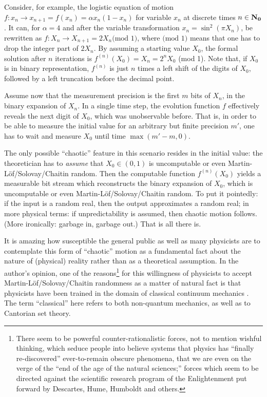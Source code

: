 Consider, for example, the
logistic equation of motion
$f:x_n\rightarrow x_{n+1}=f(x_n)=\alpha x_n(1-x_n)$ for variable $x_n$
at discrete times
$n\in {\Bbb N_0}$. It can, for $\alpha =4$
and after the variable transformation $x_n=\sin^2(\pi
X_n)$, be rewritten as $f:X_n\rightarrow X_{n+1}=2X_n \mbox{(mod
1)}$,
where $\mbox{(mod 1)}$ means that one has to drop the integer part of
$2X_n$. By assuming a starting value $X_0$, the formal solution after
$n$ iterations is $f^{(n)}(X_0)=X_n=2^nX_0$ (mod 1).
Note that,
if $X_0$ is in binary representation, $f^{(n)}$ is just $n$ times a left
 shift
of the digits of $X_0$, followed by a left truncation before the decimal
point.

Assume now that the measurement precision is the first $m$ bits of
$X_n$,
in the binary expansion of
$X_n$. In a single time step, the evolution function $f$ effectively
reveals the next digit of $X_0$, which was unobservable before.
That is, in order to be able to measure the initial value for an
arbitrary but finite precision $m'$, one has to wait and measure $X_0$
until time
$\max (m'-m,0)$.

The only possible  ``chaotic'' feature in this
scenario resides in the initial
value: the theoretician has to {\em assume} that $X_0\in (0,1)$ is
uncomputable or even Martin-L\"of/Solovay/Chaitin
random. Then the computable function $f^{(n)}(X_0)$ yields
a measurable bit stream which reconstructs the binary expansion of
$X_0$, which is uncomputable or even
Mar\-tin-L\"of\-/So\-lo\-vay/\-Chai\-tin  random.
To put it pointedly: if the input is a random real, then the output
approximates a random real; in more physical terms: if
unpredictability is assumed, then chaotic motion follows. (More
ironically:
garbage in,
garbage out.)
That is all there is.

It is amazing how susceptible the general public as well as
many physicists
are to contemplate this form of ``chaotic'' motion as a fundamental fact
about the nature of (physical) reality rather than as a theoretical
assumption.
In the author's opinion, one of the reasons\footnote{
There seem to be powerful counter-rationalistic
forces, not to mention wishful thinking, which seduce people into
believe systems that physics has ``finally re-discovered''
ever-to-remain obscure phenomena, that we are even on the verge of the
``end of the age of the natural sciences;''
forces which seem to be directed against the scientific research program
of the Enlightenment
put forward by Descartes, Hume, Humboldt and others.}
 for this willingness of physicists to
accept Mar\-tin-L\"of\-/So\-lo\-vay/\-Chai\-tin randomness as a matter
of natural fact is that physicists have been trained in
the domain of classical continuum mechanics \cite{goldstein}.
The term ``classical''
here refers to both non-quantum mechanics, as well as to Cantorian set
theory.

